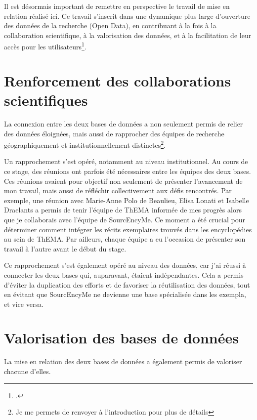 Il est désormais important de remettre en perspective le travail de mise en relation réalisé ici. Ce travail s’inscrit dans une dynamique plus large d’ouverture des données de la recherche (Open Data), en contribuant à la fois à la collaboration scientifique, à la valorisation des données, et à la facilitation de leur accès pour les utilisateurs\footcite{wesselsOpenDataKnowledge2017}.


\section{Renforcement des collaborations scientifiques}
La connexion entre les deux bases de données a non seulement permis de relier des données éloignées, mais aussi de rapprocher des équipes de recherche géographiquement et institutionnellement distinctes\footnote{Je me permets de renvoyer à l'introduction pour plus de détails}.

Un rapprochement s’est opéré, notamment au niveau institutionnel. Au cours de ce stage, des réunions ont parfois été nécessaires entre les équipes des deux bases. Ces réunions avaient pour objectif non seulement de présenter l’avancement de mon travail, mais aussi de réfléchir collectivement aux défis rencontrés. Par exemple, une réunion avec Marie-Anne Polo de Beaulieu, Elisa Lonati et Isabelle Draelants a permis de tenir l’équipe de ThEMA informée de mes progrès alors que je collaborais avec l’équipe de SourcEncyMe. Ce moment a été crucial pour déterminer comment intégrer les récits exemplaires trouvés dans les encyclopédies au sein de ThEMA. Par ailleurs, chaque équipe a eu l’occasion de présenter son travail à l'autre avant le début du stage.

Ce rapprochement s’est également opéré au niveau des données, car j’ai réussi à connecter les deux bases qui, auparavant, étaient indépendantes. Cela a permis d’éviter la duplication des efforts et de favoriser la réutilisation des données, tout en évitant que SourcEncyMe ne devienne une base spécialisée dans les exempla, et vice versa.


\section{Valorisation des bases de données}
La mise en relation des deux bases de données a également permis de valoriser chacune d’elles.


